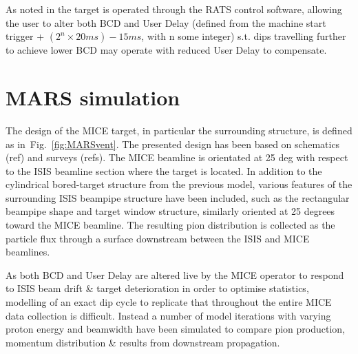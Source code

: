 \documentclass[a4paper,11pt]{article}
\begin{document}
As noted in \cite{micenote480} the target is operated through the RATS control software, allowing the user to alter both BCD and User Delay (defined from the machine start trigger + $(2^{n}\times20ms)-15ms$, with n some integer) s.t. dips travelling further to achieve lower BCD may operate with reduced User Delay to compensate. 

\section{MARS simulation}

The design of the MICE target, in particular the surrounding structure, is defined as in~Fig.~\ref{fig:MARSvent}. The presented design has been based on schematics (ref) and surveys (refs). The MICE beamline is orientated at 25 deg with respect to the ISIS beamline section where the target is located. In addition to the cylindrical bored-target structure from the previous model, various features of the surrounding ISIS beampipe structure have been included, such as the rectangular beampipe shape and target window structure, similarly oriented at 25 degrees toward the MICE beamline. The resulting pion distribution is collected as the particle flux through a surface downstream between the ISIS and MICE beamlines.

As both BCD and User Delay are altered live by the MICE operator to respond to ISIS beam drift \& target deterioration in order to optimise statistics, modelling of an exact dip cycle to replicate that throughout the entire MICE data collection is difficult. Instead a number of model iterations with varying proton energy and beamwidth have been simulated to compare pion production, momentum distribution \& results from downstream propagation. 
\end{document}
